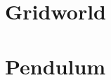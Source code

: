 \documentclass[12pt, letterpaper]{article}
\begin{document}
\section*{Gridworld}


\section*{Pendulum}

\end{document}
